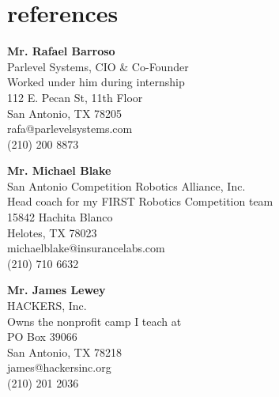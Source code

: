 
%
\section{references}
		
\textbf{Mr. Rafael Barroso} \\
Parlevel Systems, CIO \& Co-Founder \\
Worked under him during internship \\
112 E. Pecan St, 11th Floor \\
San Antonio, TX 78205 \\
rafa@parlevelsystems.com \\
(210) 200 8873

\vspace{40pt}
\textbf{Mr. Michael Blake} \\
San Antonio Competition Robotics Alliance, Inc. \\
Head coach for my FIRST Robotics Competition team \\
15842 Hachita Blanco \\
Helotes, TX 78023 \\
michaelblake@insurancelabs.com \\
(210) 710 6632

\vspace{40pt}
\textbf{Mr. James Lewey} \\
HACKERS, Inc. \\
Owns the nonprofit camp I teach at \\
PO Box 39066 \\
San Antonio, TX 78218 \\
james@hackersinc.org \\
(210) 201 2036


		
%